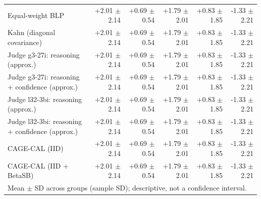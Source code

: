 \begin{tabular}{lrrrrr}
Equal-weight BLP & +2.01 {\scriptsize $\pm$ 2.14} & +0.69 {\scriptsize $\pm$ 0.54} & +1.79 {\scriptsize $\pm$ 2.01} & +0.83 {\scriptsize $\pm$ 1.85} & -1.33 {\scriptsize $\pm$ 2.21} \\
Kahn (diagonal covariance) & +2.01 {\scriptsize $\pm$ 2.14} & +0.69 {\scriptsize $\pm$ 0.54} & +1.79 {\scriptsize $\pm$ 2.01} & +0.83 {\scriptsize $\pm$ 1.85} & -1.33 {\scriptsize $\pm$ 2.21} \\
Judge g3-27i: reasoning (approx.) & +2.01 {\scriptsize $\pm$ 2.14} & +0.69 {\scriptsize $\pm$ 0.54} & +1.79 {\scriptsize $\pm$ 2.01} & +0.83 {\scriptsize $\pm$ 1.85} & -1.33 {\scriptsize $\pm$ 2.21} \\
Judge g3-27i: reasoning + confidence (approx.) & +2.01 {\scriptsize $\pm$ 2.14} & +0.69 {\scriptsize $\pm$ 0.54} & +1.79 {\scriptsize $\pm$ 2.01} & +0.83 {\scriptsize $\pm$ 1.85} & -1.33 {\scriptsize $\pm$ 2.21} \\
Judge l32-3bi: reasoning (approx.) & +2.01 {\scriptsize $\pm$ 2.14} & +0.69 {\scriptsize $\pm$ 0.54} & +1.79 {\scriptsize $\pm$ 2.01} & +0.83 {\scriptsize $\pm$ 1.85} & -1.33 {\scriptsize $\pm$ 2.21} \\
Judge l32-3bi: reasoning + confidence (approx.) & +2.01 {\scriptsize $\pm$ 2.14} & +0.69 {\scriptsize $\pm$ 0.54} & +1.79 {\scriptsize $\pm$ 2.01} & +0.83 {\scriptsize $\pm$ 1.85} & -1.33 {\scriptsize $\pm$ 2.21} \\
CAGE-CAL (IID) & +2.01 {\scriptsize $\pm$ 2.14} & +0.69 {\scriptsize $\pm$ 0.54} & +1.79 {\scriptsize $\pm$ 2.01} & +0.83 {\scriptsize $\pm$ 1.85} & -1.33 {\scriptsize $\pm$ 2.21} \\
CAGE-CAL (IID + BetaSB) & +2.01 {\scriptsize $\pm$ 2.14} & +0.69 {\scriptsize $\pm$ 0.54} & +1.79 {\scriptsize $\pm$ 2.01} & +0.83 {\scriptsize $\pm$ 1.85} & -1.33 {\scriptsize $\pm$ 2.21} \\
\bottomrule
\multicolumn{6}{l}{\scriptsize Mean $\pm$ SD across groups (sample SD); descriptive, not a confidence interval.} \\
\end{tabular}
